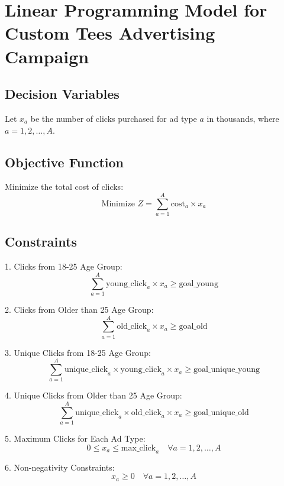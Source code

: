 \documentclass{article}
\begin{document}
\section*{Linear Programming Model for Custom Tees Advertising Campaign}

\subsection*{Decision Variables}
Let \( x_a \) be the number of clicks purchased for ad type \( a \) in thousands, where \( a = 1, 2, \ldots, A \).

\subsection*{Objective Function}
Minimize the total cost of clicks:
\[
\text{Minimize } Z = \sum_{a=1}^{A} \text{cost}_a \times x_a
\]

\subsection*{Constraints}

1. Clicks from 18-25 Age Group:
\[
\sum_{a=1}^{A} \text{young\_click}_{a} \times x_a \geq \text{goal\_young}
\]

2. Clicks from Older than 25 Age Group:
\[
\sum_{a=1}^{A} \text{old\_click}_{a} \times x_a \geq \text{goal\_old}
\]

3. Unique Clicks from 18-25 Age Group:
\[
\sum_{a=1}^{A} \text{unique\_click}_{a} \times \text{young\_click}_{a} \times x_a \geq \text{goal\_unique\_young}
\]

4. Unique Clicks from Older than 25 Age Group:
\[
\sum_{a=1}^{A} \text{unique\_click}_{a} \times \text{old\_click}_{a} \times x_a \geq \text{goal\_unique\_old}
\]

5. Maximum Clicks for Each Ad Type:
\[
0 \leq x_a \leq \text{max\_click}_{a} \quad \forall a = 1, 2, \ldots, A
\]

6. Non-negativity Constraints:
\[
x_a \geq 0 \quad \forall a = 1, 2, \ldots, A
\]
\end{document}
